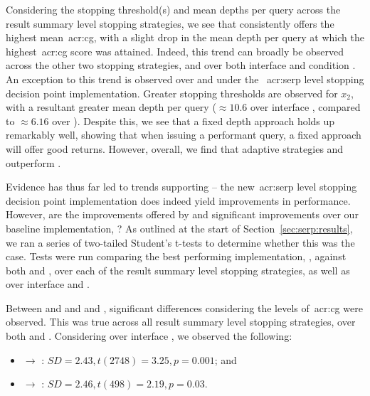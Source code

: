 Considering the stopping threshold(s) and mean depths per query across the result summary level stopping strategies, we see that  consistently offers the highest mean~\gls{acr:cg}, with a slight drop in the mean depth per query at which the highest~\gls{acr:cg} score was attained. Indeed, this trend can broadly be observed across the other two stopping strategies, and over both interface  and condition . An exception to this trend is observed over  and  under the ~\gls{acr:serp} level stopping decision point implementation. Greater stopping thresholds are observed for $x_2$, with a resultant greater mean depth per query ($\approx10.6$ over interface , compared to $\approx6.16$ over ). Despite this, we see that a fixed depth approach holds up remarkably well, showing that when issuing a performant query, a fixed approach will offer good returns. However, overall, we find that adaptive strategies  and  outperform .

Evidence has thus far led to trends supporting  -- the new~\gls{acr:serp} level stopping decision point implementation does indeed yield improvements in performance. However, are the improvements offered by  and  significant improvements over our baseline implementation, ? As outlined at the start of Section~\ref{sec:serp:results}, we ran a series of two-tailed Student's t-tests to determine whether this was the case. Tests were run comparing the best performing implementation, , against both  and , over each of the result summary level stopping strategies, as well as over interface  and .

Between  and  and  and , significant differences considering the levels of~\gls{acr:cg} were observed. This was true across all result summary level stopping strategies, over both  and . Considering  over interface , we observed the following:

\begin{itemize}
    \item{ $\rightarrow$ : $SD=2.43, t(2748)=3.25, p=0.001$; and}
    \item{ $\rightarrow$ : $SD=2.46, t(498)=2.19, p=0.03$.}
\end{itemize}

